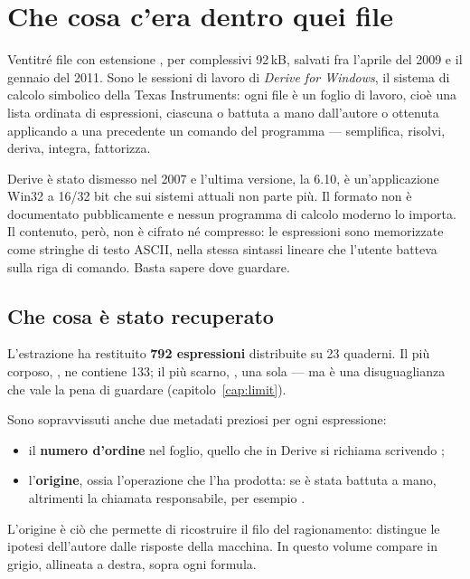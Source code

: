 \chapter{Che cosa c'era dentro quei file}
\label{cap:contesto}

Ventitr\'e file con estensione , per complessivi 92\,kB, salvati
fra l'aprile del 2009 e il gennaio del 2011. Sono le sessioni di lavoro di
\emph{Derive for Windows}, il sistema di calcolo simbolico della Texas
Instruments: ogni file \`e un foglio di lavoro, cio\`e una lista ordinata di
espressioni, ciascuna o battuta a mano dall'autore o ottenuta applicando a
una precedente un comando del programma --- semplifica, risolvi, deriva,
integra, fattorizza.

Derive \`e stato dismesso nel 2007 e l'ultima versione, la 6.10, \`e
un'applicazione Win32 a 16/32 bit che sui sistemi attuali non parte pi\`u.
Il formato  non \`e documentato pubblicamente e nessun programma
di calcolo moderno lo importa. Il contenuto, per\`o, non \`e cifrato n\'e
compresso: le espressioni sono memorizzate come stringhe di testo ASCII,
nella stessa sintassi lineare che l'utente batteva sulla riga di comando.
Basta sapere dove guardare.

\section{Che cosa \`e stato recuperato}

L'estrazione ha restituito \textbf{792 espressioni} distribuite su
23 quaderni. Il pi\`u corposo, , ne contiene 133; il pi\`u
scarno, , una sola --- ma \`e una disuguaglianza che vale la
pena di guardare (capitolo~\ref{cap:limit}).

Sono sopravvissuti anche due metadati preziosi per ogni espressione:

\begin{itemize}[leftmargin=1.4em,itemsep=2pt]
  \item il \textbf{numero d'ordine} nel foglio, quello che in Derive si
        richiama scrivendo ;
  \item l'\textbf{origine}, ossia l'operazione che l'ha prodotta:
         se \`e stata battuta a mano, altrimenti la chiamata
        responsabile, per esempio .
\end{itemize}

\noindent
L'origine \`e ci\`o che permette di ricostruire il filo del ragionamento:
distingue le ipotesi dell'autore dalle risposte della macchina. In questo
volume compare in grigio, allineata a destra, sopra ogni formula.

